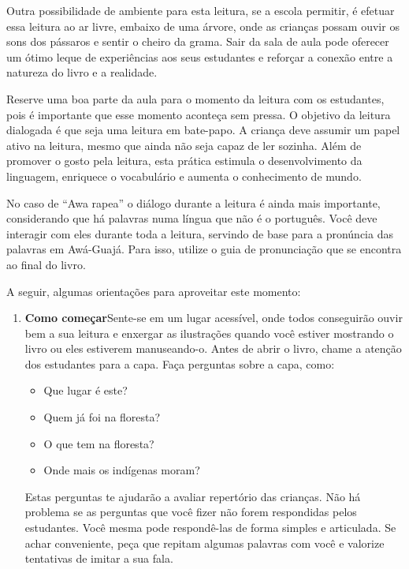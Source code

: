 \documentclass[11pt]{extarticle}
\begin{document}
{{

Outra possibilidade de ambiente para esta leitura, se a escola permitir, 
é efetuar essa leitura ao ar livre, embaixo de uma árvore, onde as crianças 
possam ouvir os sons dos pássaros e sentir o cheiro da grama. Sair da sala 
de aula pode oferecer um ótimo leque de experiências aos seus estudantes e 
reforçar a conexão entre a natureza do livro e a realidade.  

Reserve uma boa parte da aula para o momento da leitura com os estudantes, 
pois é importante que esse momento aconteça sem pressa. O objetivo da 
leitura dialogada é que seja uma leitura em bate-papo. A criança deve 
assumir um papel ativo na leitura, mesmo que ainda não seja capaz de 
ler sozinha. Além de promover o gosto pela leitura, esta prática estimula 
o desenvolvimento da linguagem, enriquece o vocabulário e 
aumenta o conhecimento de mundo.

No caso de ``Awa rapea'' o diálogo durante a leitura é 
ainda mais importante, considerando que há palavras numa língua que não é o português. 
Você deve interagir com eles durante toda a 
leitura, servindo de base para a pronúncia das palavras em Awá-Guajá.
Para isso, utilize o guia de pronunciação que se encontra ao final do livro.

A seguir, algumas orientações para aproveitar este momento: 

\begin{enumerate}
\item \textbf{Como começar}\quad Sente-se em um lugar acessível, 
onde todos conseguirão ouvir bem a sua leitura e enxergar as ilustrações 
quando você estiver mostrando o livro ou eles estiverem manuseando-o. 
Antes de abrir o livro, chame a atenção dos estudantes para a capa. 
Faça perguntas sobre a capa, como: 

\begin{itemize}
\item Que lugar é este?
\item Quem já foi na floresta?
\item O que tem na floresta?
\item Onde mais os indígenas moram?
\end{itemize}

Estas perguntas te ajudarão a avaliar repertório das crianças. 
Não há problema se as perguntas que você fizer não forem respondidas pelos 
estudantes. Você mesma pode respondê-las de forma simples e articulada. Se achar 
conveniente, peça que repitam algumas palavras com você e valorize tentativas 
de imitar a sua fala. 


\end{enumerate}}}
\end{document}

